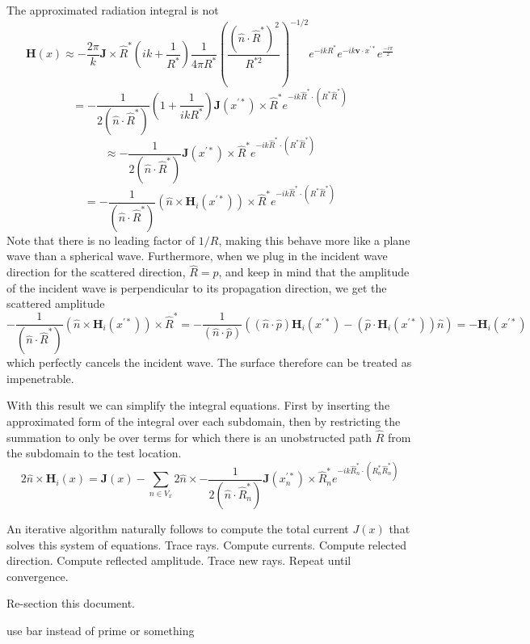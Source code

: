\documentclass{article}
\theoremstyle{plain}
\begin{document}
The approximated radiation integral is not 
\begin{equation}
	\mathbf{H}(x) \approx
	-\frac{2\pi}{k}
	\mathbf{J} \times \hat{R}^*
	\left( ik + \frac{1}{R^*} \right)
	\frac{1}{4\pi R^*}
	\left( \frac{\left(\hat{n}\cdot\hat{R}^*\right)^2}{R^{*2}} \right)^{-1/2}
	e^{-ikR^*}
	e^{-ik\mathbf{v}\cdot x^{'*}}
	e^{\frac{-i\pi}{2}}
\end{equation}
\begin{equation}
	=
	-\frac{1}{2\left(\hat{n}\cdot\hat{R}^*\right)}
	\left( 1 + \frac{1}{ikR^*} \right)
	\mathbf{J}(x^{'*}) \times \hat{R}^*
	e^{-ik\hat{R}^*\cdot (R^*\hat{R}^*)}
\end{equation}
\begin{equation}
	\approx
	-\frac{1}{2\left(\hat{n}\cdot\hat{R}^*\right)}
	\mathbf{J}(x^{'*}) \times \hat{R}^*
	e^{-ik\hat{R}^*\cdot (R^*\hat{R}^*)}
\end{equation}
\begin{equation}
	=
	-\frac{1}{\left(\hat{n}\cdot\hat{R}^*\right)}
	\left( \hat{n} \times \mathbf{H}_i(x^{'*}) \right) \times \hat{R}^*
	e^{-ik\hat{R}^*\cdot (R^*\hat{R}^*)}
\end{equation}
Note that there is no leading factor of $1/R$,
making this behave more like a plane wave than a spherical wave.
Furthermore, when we plug in the incident wave direction for the scattered direction, 
$\hat{R}=\hat{p}$, 
and keep in mind that the amplitude of the incident wave is perpendicular to its propagation direction,
we get the scattered amplitude
\begin{equation}
	-\frac{1}{\left(\hat{n}\cdot\hat{R}^*\right)}
	\left( \hat{n} \times \mathbf{H}_i(x^{'*}) \right) \times \hat{R}^*
	=
	-\frac{1}{\left(\hat{n}\cdot\hat{p}\right)}
	\left( \left(\hat{n}\cdot\hat{p}\right)\mathbf{H}_i(x^{'*}) - \left( \hat{p}\cdot\mathbf{H}_i(x^{'*}) \right)\hat{n} \right)
	= -\mathbf{H}_i(x^{'*})
\end{equation}
which perfectly cancels the incident wave.
The surface therefore can be treated as impenetrable.


With this result we can simplify the integral equations.
First by inserting the approximated form of the integral over each subdomain,
then by restricting the summation to only be over terms for which there is an
unobstructed path $\hat{R}$ from the subdomain to the test location.
\begin{equation}
	2\hat{n}\times\mathbf{H}_i(x)
	= \mathbf{J}(x)
	- \sum_{n\in V_x} 2\hat{n}\times
	-\frac{1}{2\left(\hat{n}\cdot\hat{R}^*_n\right)}
	\mathbf{J}(x^{'*}_n) \times \hat{R}^*_n
	e^{-ik\hat{R}^*_n\cdot (R^*_n\hat{R}^*_n)}
\end{equation}

An iterative algorithm naturally follows to compute the total current $J(x)$ that solves this system of equations.
Trace rays.
Compute currents.
Compute relected direction.
Compute reflected amplitude.
Trace new rays.
Repeat until convergence.

Re-section this document.

use bar instead of prime or something
\end{document}
